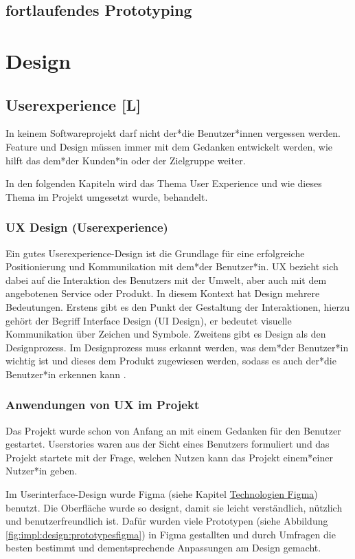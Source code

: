 \cite{Ideenfindung}

\subsection{fortlaufendes Prototyping}
\label{ch::ongoing-prototyping}

\section{Design}
\subsection{Userexperience [L]}
In keinem Softwareprojekt darf nicht der*die Benutzer*innen vergessen werden. Feature und Design müssen immer mit dem Gedanken entwickelt werden, wie hilft das dem*der Kunden*in oder der Zielgruppe weiter.

In den folgenden Kapiteln wird das Thema User Experience und wie dieses Thema im Projekt umgesetzt wurde, behandelt.
\subsubsection{UX Design (Userexperience)}
Ein gutes Userexperience-Design ist die Grundlage für eine erfolgreiche Positionierung und Kommunikation mit dem*der Benutzer*in.
UX bezieht sich dabei auf die Interaktion des Benutzers mit der Umwelt, aber auch mit dem angebotenen Service oder Produkt. In diesem Kontext hat Design mehrere Bedeutungen.
Erstens gibt es den Punkt der Gestaltung der Interaktionen, hierzu gehört der Begriff Interface Design (UI Design), er bedeutet visuelle Kommunikation über Zeichen und Symbole.
Zweitens gibt es Design als den Designprozess. Im Designprozess muss erkannt werden, was dem*der Benutzer*in wichtig ist und dieses dem Produkt zugewiesen werden, sodass es auch der*die Benutzer*in erkennen kann \cite{UserExperienceDesign}.

\subsubsection{Anwendungen von UX im Projekt}
Das Projekt wurde schon von Anfang an mit einem Gedanken für den Benutzer gestartet. Userstories waren aus der Sicht eines Benutzers formuliert und das Projekt startete mit der Frage, welchen Nutzen kann das Projekt einem*einer Nutzer*in geben.

Im Userinterface-Design wurde Figma (siehe Kapitel \hyperref[ch::technologies::figma]{Technologien Figma}) benutzt. Die Oberfläche wurde so designt, damit sie leicht verständlich, nützlich und benutzerfreundlich ist. Dafür wurden viele Prototypen (siehe Abbildung \ref{fig:impl:design:prototypesfigma}) in Figma gestallten und durch Umfragen die besten bestimmt und dementsprechende Anpassungen am Design gemacht.

